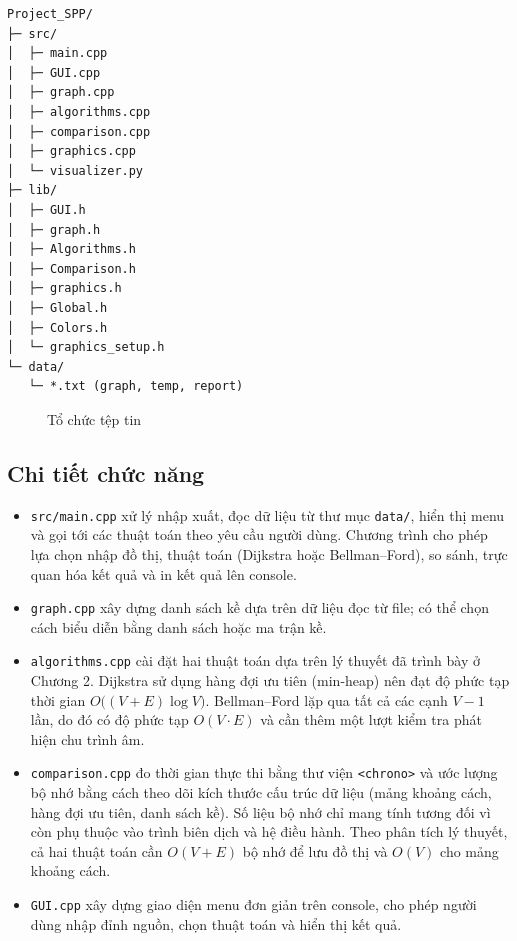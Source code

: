 \documentclass[14pt,a4paper]{report}
\begin{document}
\begin{tcolorbox}[colback=white,colframe=black,boxrule=0.8pt,arc=2mm,breakable]
\fontsize{11pt}{12pt}
\begin{verbatim}
Project_SPP/
├─ src/
│  ├─ main.cpp
│  ├─ GUI.cpp
│  ├─ graph.cpp
│  ├─ algorithms.cpp
│  ├─ comparison.cpp
│  ├─ graphics.cpp
│  └─ visualizer.py
├─ lib/
│  ├─ GUI.h
│  ├─ graph.h
│  ├─ Algorithms.h
│  ├─ Comparison.h
│  ├─ graphics.h
│  ├─ Global.h
│  ├─ Colors.h
│  └─ graphics_setup.h
└─ data/
   └─ *.txt (graph, temp, report)

\end{verbatim}
\end{tcolorbox}

\begin{figure}[H]
    \centering
    \caption{Tổ chức tệp tin}
    \label{fig:placeholder}
\end{figure}

\subsection{Chi tiết chức năng}
\begin{itemize}
  \item \texttt{src/main.cpp} xử lý nhập xuất, đọc dữ liệu từ thư mục \texttt{data/}, hiển thị menu và gọi tới các thuật toán theo yêu cầu người dùng. Chương trình cho phép lựa chọn nhập đồ thị, thuật toán (Dijkstra hoặc Bellman--Ford), so sánh, trực quan hóa kết quả và in kết quả lên console.

  \item \texttt{graph.cpp} xây dựng danh sách kề dựa trên dữ liệu đọc từ file; có thể chọn cách biểu diễn bằng danh sách hoặc ma trận kề.

  \item \texttt{algorithms.cpp} cài đặt hai thuật toán dựa trên lý thuyết đã trình bày ở Chương 2. Dijkstra sử dụng hàng đợi ưu tiên (min-heap) nên đạt độ phức tạp thời gian $O\big((V+E)\log V\big)$. Bellman--Ford lặp qua tất cả các cạnh $V-1$ lần, do đó có độ phức tạp $O(V\cdot E)$ và cần thêm một lượt kiểm tra phát hiện chu trình âm.

  \item \texttt{comparison.cpp} đo thời gian thực thi bằng thư viện \texttt{<chrono>} và ước lượng bộ nhớ bằng cách theo dõi kích thước cấu trúc dữ liệu (mảng khoảng cách, hàng đợi ưu tiên, danh sách kề). Số liệu bộ nhớ chỉ mang tính tương đối vì còn phụ thuộc vào trình biên dịch và hệ điều hành. Theo phân tích lý thuyết, cả hai thuật toán cần $O(V+E)$ bộ nhớ để lưu đồ thị và $O(V)$ cho mảng khoảng cách.

  \item \texttt{GUI.cpp} xây dựng giao diện menu đơn giản trên console, cho phép người dùng nhập đỉnh nguồn, chọn thuật toán và hiển thị kết quả.
\end{itemize}
\end{document}
